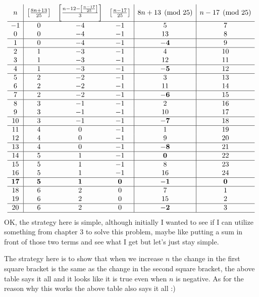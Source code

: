 \documentclass[aps,preprint,preprintnumbers,nofootinbib,showpacs,prd]{revtex4-1}
\newcommand{\nbea}{\begin{eqnarray*}}
\newcommand{\neea}{\end{eqnarray*}}
\begin{document}
%
\nbea
\begin{array}{c|c c c | c | c}
n & \left\lbrack \frac{8n+13}{25}\right\rbrack & \left \lbrack \frac{n - 12 - \left \lbrack \frac{n-17}{25}\right \rbrack}{3} \right \rbrack & \left\lbrack\frac{n-17}{25}\right\rbrack & 8n+13 \pmod{25} & n-17 \pmod{25}\\ \hline
-1 & 0 & -4 & -1 & 5 & 7 \\
0 & 0 & -4 & -1 & 13 & 8 \\ \hline
1 & 0 & -4 & -1 & {\bf -4} & 9 \\ \hline
2 & 1 & -3 & -1 & 4 & 10 \\
3 & 1 & -3 & -1 & 12 & 11 \\ \hline
4 & 1 & -3 & -1 & {\bf -5} & 12 \\ \hline
5 & 2 & -2 & -1 & 3 & 13 \\
6 & 2 & -2 & -1 & 11 & 14 \\ \hline
7 & 2 & -2 & -1 & {\bf -6} & 15 \\ \hline
8 & 3 & -1 & -1 & 2 & 16 \\
9 & 3 & -1 & -1 & 10 & 17 \\ \hline
10 & 3 & -1 & -1 & {\bf -7} & 18 \\ \hline
11 & 4 & 0 & -1 & 1 & 19 \\
12 & 4 & 0 & -1 & 9 & 20 \\ \hline
13 & 4 & 0 & -1 & {\bf -8} & 21 \\ \hline
14 & 5 & 1 & -1 & {\bf 0} & 22 \\ \hline
15 & 5 & 1 & -1 & 8 & 23 \\
16 & 5 & 1 & -1 & 16 & 24 \\ \hline
{\bf 17} & {\bf 5} & {\bf 1} & {\bf 0} & {\bf -1} & {\bf 0} \\ \hline
18 & 6 & 2 & 0 & 7 & 1 \\
19 & 6 & 2 & 0 & 15 & 2 \\ \hline
20 & 6 & 2 & 0 & {\bf -2} & 3\\ \hline
\end{array}
\neea
%
OK, the strategy here is simple, although initially I wanted to see if I can utilize something from chapter 3 to solve this problem, maybe like putting a sum in front of those two terms and see what I get but let's just stay simple.

The strategy here is to show that when we increase $n$ the change in the first square bracket is the same as the change in the second square bracket, the above table says it all and it looks like it is true even when $n$ is negative. As for the reason why this works the above table also says it all :)
\end{document}
